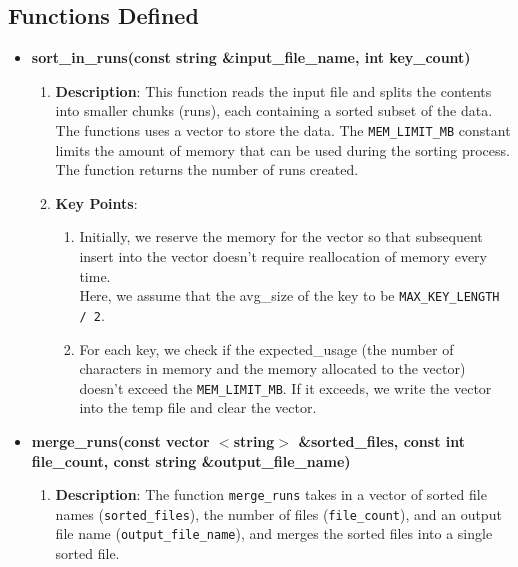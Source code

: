 \documentclass{article}
\begin{document}
    \subsection{Functions Defined}
        \begin{itemize}
            \item \textbf{sort\_in\_runs(const string \&input\_file\_name, int key\_count)}
                \begin{enumerate}[label=\star]
                    \item \textbf{Description}: This function reads the input file and splits the contents into smaller chunks (runs), each containing a sorted subset of the data. The functions uses a vector to store the data. The \verb|MEM_LIMIT_MB| constant limits the amount of memory that can be used during the sorting process. The function returns the number of runs created. 
                    \item \textbf{Key Points}: 
                        \begin{enumerate}
                            \item Initially, we reserve the memory for the vector so that subsequent insert into the vector doesn't require reallocation of memory every time.\\
                            Here, we assume that the avg\_size of the key to be \verb|MAX_KEY_LENGTH / 2|.
                            \item For each key, we check if the expected\_usage (the number of characters in memory and the memory allocated to the vector) doesn't exceed the \verb|MEM_LIMIT_MB|. If it exceeds, we write the vector into the temp file and clear the vector. 
                        \end{enumerate}
                \end{enumerate}
            \item \textbf{merge\_runs(const vector $<$string$>$ \&sorted\_files, const int file\_count,
                const string \&output\_file\_name)}
                \begin{enumerate}[label = \star]
                    \item \textbf{Description}: The function \verb|merge_runs| takes in a vector of sorted file names (\verb|sorted_files|), the number of files (\verb|file_count|), and an output file name (\verb|output_file_name|), and merges the sorted files into a single sorted file.


\end{enumerate}
\end{itemize}
\end{document}
